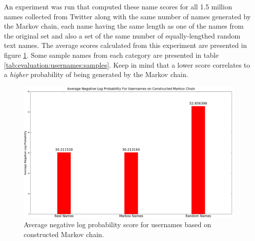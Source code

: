 An experiment was run that computed these name scores for all 1.5 million names
collected from Twitter along with the same number of names generated by the
Markov chain, each name having the same length as one of the names from the
original set and also a set of the same number of equally-lengthed random text
names.  The average scores calculated from this experiment are presented in
figure \ref{fig:evaluation:usernames:average}.  Some sample names from each
category are presented in table \ref{tab:evaluation:usernames:samples}.  Keep
in mind that a lower score correlates to a \emph{higher} probability of being
generated by the Markov chain.

\begin{figure}
\centering
\includegraphics[width=\columnwidth]{usernames-average.eps}
\caption{Average negative log probability score for usernames based on constructed Markov chain.}
\label{fig:evaluation:usernames:average}
\end{figure}

